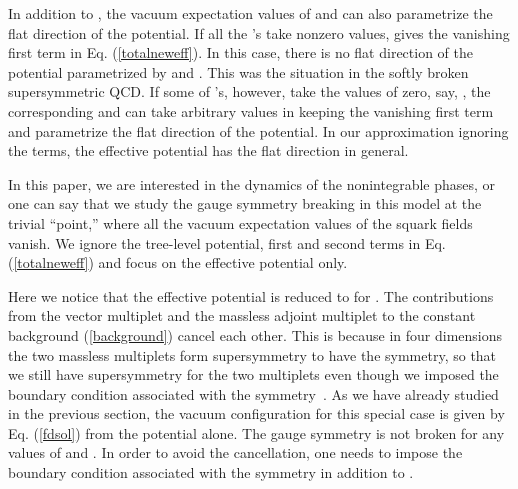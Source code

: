 \documentclass[a4paper,12pt]{article}
\begin{document}
\par
In addition to \coordHE{}, the vacuum 
expectation values of \coordHE{} and \coordHE{} can also 
parametrize the flat direction of the potential. 
If all the \coordHE{}'s take nonzero values, 
\coordHE{} gives the 
vanishing first term in Eq. (\ref{totalneweff}). 
In this case, there is no flat direction
of the potential parametrized by \coordHE{} and \coordHE{}. 
This was the situation in the softly 
broken supersymmetric QCD. 
If some of \coordHE{}'s, however, take the values of 
zero, say, \coordHE{}, the corresponding 
\coordHE{} and \coordHE{} can take 
arbitrary values in keeping the vanishing first term and parametrize
the flat direction of the potential. In our approximation
ignoring the \coordHE{} terms, the effective potential has the 
flat direction in general.
\par
In this paper, we are interested in the dynamics of the nonintegrable 
phases, or one can say that 
we study the gauge symmetry breaking in this
model at the trivial ``point,'' where all the vacuum expectation 
values of the squark 
fields \coordHE{} vanish.  We  
ignore the tree-level potential, first and second terms in 
Eq. (\ref{totalneweff}) and  
focus on the effective potential \coordHE{} only.
\par
Here we notice that the effective potential \coordHE{} is 
reduced to \coordHE{} for \coordHE{}. 
The contributions from the vector multiplet 
\coordHE{} and the massless adjoint 
multiplet \coordHE{} to the constant 
background (\ref{background})
cancel each other. This is because in four dimensions the two 
massless multiplets form \coordHE{} supersymmetry 
to have the \coordHE{} symmetry, so that we still have 
\coordHE{} supersymmetry for the two multiplets even though
we imposed the boundary condition
associated with the \coordHE{} symmetry~\cite{takenaga}. 
As we have already studied in the previous 
section, the vacuum configuration for this special case is 
given by Eq. (\ref{fdsol}) from 
the potential \coordHE{} alone. The \coordHE{} gauge 
symmetry is not broken for any 
values of \coordHE{} and \myHighlight{$\beta$}\coordHE{}. In order to avoid the cancellation, one 
needs to impose the boundary condition
associated with the \coordHE{} symmetry in addition to \coordHE{}.
\end{document}
